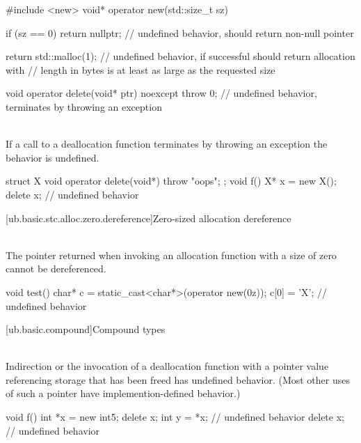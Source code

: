 \pnum
\begin{example}
\begin{codeblock}
#include <new>
void* operator new(std::size_t sz) {
  if (sz == 0)
    return nullptr;             // undefined behavior,  should return non-null pointer

  return std::malloc(1);        // undefined behavior, if successful should return allocation with
                                // length in bytes is at least as large as the requested size
}
void operator delete(void* ptr) noexcept {
  throw 0;                      // undefined behavior, terminates by throwing an exception
}
\end{codeblock}
\end{example}

\pnum
{} \\
If a call to a deallocation function
terminates by throwing an exception
the behavior is undefined.
\pnum
\begin{example}
\begin{codeblock}
struct X {
  void operator delete(void*) { throw "oops"; }
};
void f()
{
  X* x = new X();
  delete x;     // undefined behavior
}
\end{codeblock}
\end{example}



[ub.basic.stc.alloc.zero.dereference]{Zero-sized allocation dereference}

\pnum
{} \\
The pointer returned when invoking an allocation function with a size of zero
cannot be dereferenced.

\pnum
\begin{example}
\begin{codeblock}
void test()
{
    char* c = static_cast<char*>(operator new(0z));
    c[0] = 'X';     // undefined behavior
}
\end{codeblock}
\end{example}

[ub.basic.compound]{Compound types}

\pnum
{} \\
Indirection or
the invocation of a deallocation function
with a pointer value referencing storage
that has been freed
has undefined behavior.
(Most other uses of such a pointer have
implemention-defined behavior.)

\pnum
\begin{example}
\begin{codeblock}
void f()
{
    int *x = new int{5};
    delete x;
    int y = *x; // undefined behavior
    delete x;   // undefined behavior
}
\end{codeblock}
\end{example}


